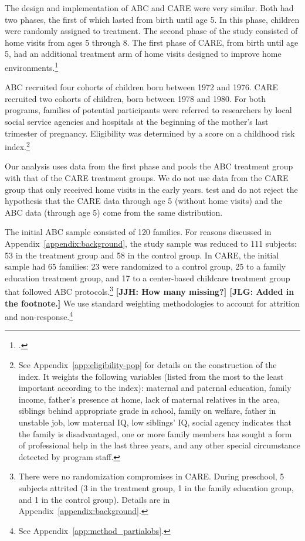 The design and implementation of ABC and CARE were very similar. Both had two phases, the first of which lasted from birth until age 5. In this phase, children were randomly assigned to treatment. The second phase of the study consisted of home visits from ages 5 through 8. The first phase of CARE, from birth until age 5, had an additional treatment arm of home visits designed to improve home environments.\footnote{\citet{Wasik_Ramey_etal_1990_CD}.}

ABC recruited four cohorts of children born between 1972 and 1976. CARE recruited two cohorts of children, born between 1978 and 1980. For both programs, families of potential participants were referred to researchers by local social service agencies and hospitals at the beginning of the mother's last trimester of pregnancy. Eligibility was determined by a score on a childhood risk index.\footnote{See  Appendix~\ref{app:eligibility-pop} for details on the construction of the index. It weights the following variables (listed from the most to the least important according to the index): maternal and paternal education, family income, father's presence at home, lack of maternal relatives in the area, siblings behind appropriate grade in school, family on welfare, father in unstable job, low maternal IQ, low siblings' IQ, social agency indicates that the family is disadvantaged, one or more family members has sought a form of professional help in the last three years, and any other special circumstance detected by program staff.}

Our analysis uses data from the first phase and pools the ABC treatment group with that of the CARE treatment groups. We do not use data from the CARE group that only received home visits in the early years. \cite{Campbell_Conti_etal_2014_EarlyChildhoodInvestments} test and do not reject the hypothesis that the CARE data through age 5 (without home visits) and the ABC data (through age 5) come from the same distribution.

The initial ABC sample consisted of 120 families. For reasons discussed in Appendix~\ref{appendix:background}, the study sample was reduced to 111 subjects: 53 in the treatment group and 58 in the control group. In CARE, the initial sample had 65 families: 23 were randomized to a control group, 25 to a family education treatment group, and 17 to a center-based childcare treatment group that followed ABC protocols.\footnote{There were no randomization compromises in CARE. During preschool, 5 subjects attrited (3 in the treatment group, 1 in the family education group, and 1 in the control group). Details are in Appendix~\ref{appendix:background}.} \textbf{[JJH: How many missing?] [JLG: Added in the footnote.]} We use standard weighting methodologies to account for attrition and non-response.\footnote{See Appendix~\ref{app:method_partialobs}.}

